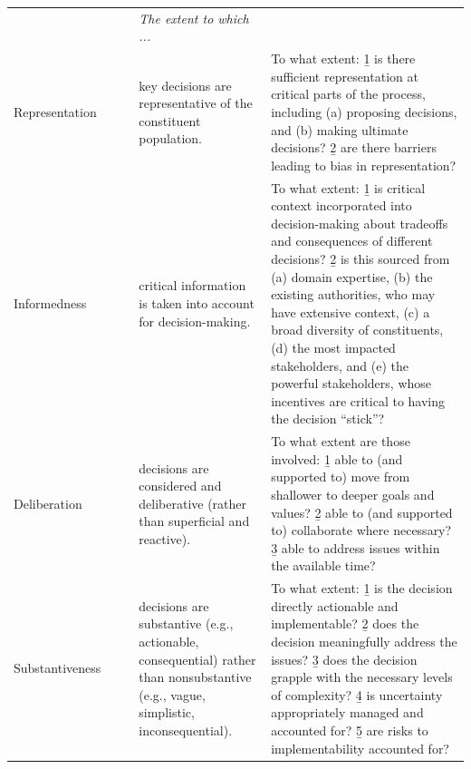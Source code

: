 \begin{tabular}{@{} >{\small}l@{} >{\raggedright\arraybackslash\small}p{} >{\raggedright\arraybackslash\small}p{}@{}}
    \multicolumn{3}{@{}l}{\textbf { Process Quality} \small {\textit{(relates to the democratic infrastructure)}}}  \\

    \midrule
    
    & \textit{The extent to which ...} & \\

    Representation
        & key decisions are representative of the constituent population.
        & To what extent: \b{1} is there sufficient representation at critical parts of the process, including (a) proposing decisions, and (b) making ultimate decisions? \b{2} are there barriers leading to bias in representation? \\

    Informedness
        & critical information is taken into account for decision-making.
        & To what extent: \b{1} is critical context incorporated into decision-making about tradeoffs and consequences of different decisions? \b{2} is this sourced from (a) domain expertise, (b) the existing authorities, who may have extensive context, (c) a broad diversity of constituents, (d) the most impacted stakeholders, and (e) the powerful stakeholders, whose incentives are critical to having the decision ``stick''? \\

    Deliberation
        & decisions are considered and deliberative (rather than superficial and reactive).
        & To what extent are those involved: \b{1} able to (and supported to) move from shallower to deeper goals and values? \b{2} able to (and supported to) collaborate where necessary? \b{3} able to address issues within the available time?
        \\

    Substantiveness\ \ \ \ 
        & decisions are substantive (e.g., actionable, consequential) rather than nonsubstantive (e.g., vague, simplistic, inconsequential). 
        & To what extent: \b{1} is the decision directly actionable and implementable? \b{2} does the decision meaningfully address the issues? \b{3} does the decision grapple with the necessary levels of complexity? \b{4} is uncertainty appropriately managed and accounted for? \b{5} are risks to implementability accounted for? \\


\end{tabular}
